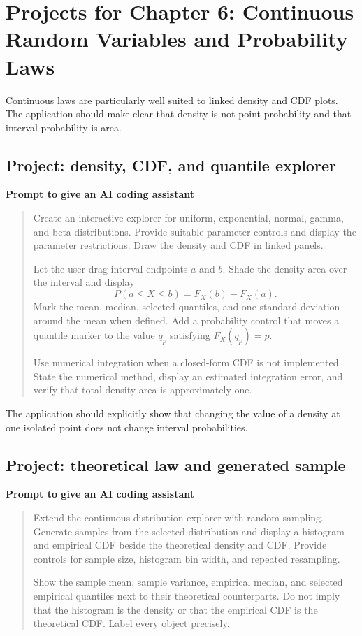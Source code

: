 \section{Projects for Chapter 6: Continuous Random Variables and Probability Laws}

Continuous laws are particularly well suited to linked density and CDF plots. The application should make clear that density is not point probability and that interval probability is area.

\subsection*{Project: density, CDF, and quantile explorer}

\begin{examplebox}
\textbf{Prompt to give an AI coding assistant}

\begin{quote}\small
Create an interactive explorer for uniform, exponential, normal, gamma, and beta distributions. Provide suitable parameter controls and display the parameter restrictions. Draw the density and CDF in linked panels.

Let the user drag interval endpoints \(a\) and \(b\). Shade the density area over the interval and display
\[
P(a\leq X\leq b)=F_X(b)-F_X(a).
\]
Mark the mean, median, selected quantiles, and one standard deviation around the mean when defined. Add a probability control that moves a quantile marker to the value \(q_p\) satisfying \(F_X(q_p)=p\).

Use numerical integration when a closed-form CDF is not implemented. State the numerical method, display an estimated integration error, and verify that total density area is approximately one.
\end{quote}
\end{examplebox}

The application should explicitly show that changing the value of a density at one isolated point does not change interval probabilities.

\subsection*{Project: theoretical law and generated sample}

\begin{examplebox}
\textbf{Prompt to give an AI coding assistant}

\begin{quote}\small
Extend the continuous-distribution explorer with random sampling. Generate samples from the selected distribution and display a histogram and empirical CDF beside the theoretical density and CDF. Provide controls for sample size, histogram bin width, and repeated resampling.

Show the sample mean, sample variance, empirical median, and selected empirical quantiles next to their theoretical counterparts. Do not imply that the histogram is the density or that the empirical CDF is the theoretical CDF. Label every object precisely.
\end{quote}
\end{examplebox}

